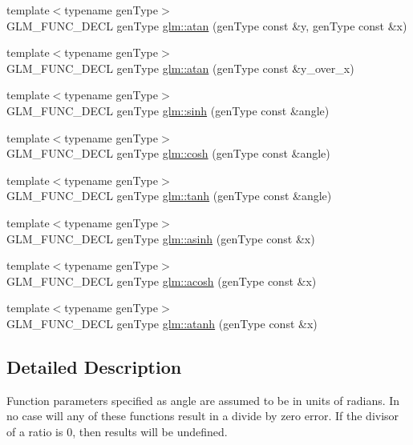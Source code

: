 \begin{CompactItemize}
\item 
{\footnotesize template$<$typename genType$>$ }\\GLM\_\-FUNC\_\-DECL genType \hyperlink{group__core__func__trigonometric_gb89f4e2a1ea1426dc87ab3a06901b68a}{glm::atan} (genType const \&y, genType const \&x)
\item 
{\footnotesize template$<$typename genType$>$ }\\GLM\_\-FUNC\_\-DECL genType \hyperlink{group__core__func__trigonometric_g459eaa7149e799125acda24938114746}{glm::atan} (genType const \&y\_\-over\_\-x)
\item 
{\footnotesize template$<$typename genType$>$ }\\GLM\_\-FUNC\_\-DECL genType \hyperlink{group__core__func__trigonometric_g925002c6a847894241278997d189429a}{glm::sinh} (genType const \&angle)
\item 
{\footnotesize template$<$typename genType$>$ }\\GLM\_\-FUNC\_\-DECL genType \hyperlink{group__core__func__trigonometric_g522e0c2f8dbac0df60a2bf436fb88e69}{glm::cosh} (genType const \&angle)
\item 
{\footnotesize template$<$typename genType$>$ }\\GLM\_\-FUNC\_\-DECL genType \hyperlink{group__core__func__trigonometric_gaa29bdd7f3b57755a7b6a9834d59887f}{glm::tanh} (genType const \&angle)
\item 
{\footnotesize template$<$typename genType$>$ }\\GLM\_\-FUNC\_\-DECL genType \hyperlink{group__core__func__trigonometric_gaedecffe9a7c10e5930c4ec938a0ca2e}{glm::asinh} (genType const \&x)
\item 
{\footnotesize template$<$typename genType$>$ }\\GLM\_\-FUNC\_\-DECL genType \hyperlink{group__core__func__trigonometric_g7d91deddd26925a390f08448a1b9ab1a}{glm::acosh} (genType const \&x)
\item 
{\footnotesize template$<$typename genType$>$ }\\GLM\_\-FUNC\_\-DECL genType \hyperlink{group__core__func__trigonometric_g5207916954ad98477bf488a9a188f045}{glm::atanh} (genType const \&x)
\end{CompactItemize}


\subsection{Detailed Description}
Function parameters specified as angle are assumed to be in units of radians. In no case will any of these functions result in a divide by zero error. If the divisor of a ratio is 0, then results will be undefined.

